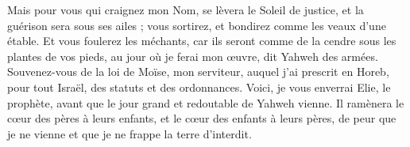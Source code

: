 \begin{multicols}{2}
Mais pour vous qui craignez mon Nom, se lèvera le Soleil de justice, et la guérison sera sous ses ailes ; vous sortirez, et bondirez comme les veaux d’une étable.
Et vous foulerez les méchants, car ils seront comme de la cendre sous les plantes de vos pieds, au jour où je ferai mon œuvre, dit Yahweh des armées.
Souvenez-vous de la loi de Moïse, mon serviteur, auquel j’ai prescrit en Horeb, pour tout Israël, des statuts et des ordonnances.
Voici, je vous enverrai Elie, le prophète, avant que le jour grand et redoutable de Yahweh vienne.
Il ramènera le cœur des pères à leurs enfants, et le cœur des enfants à leurs pères, de peur que je ne vienne et que je ne frappe la terre d’interdit.
\PPE{}
\end{multicols}
